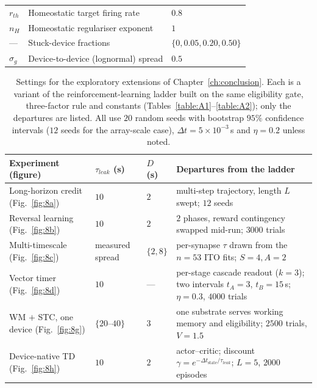\begin{table}[htbp!]
\begin{center}
\begin{tabularx}{\textwidth}{@{}l X l@{}}
    $r_{th}$       & Homeostatic target firing rate                 & $0.8$ \\
    $n_H$          & Homeostatic regulariser exponent               & $1$ \\
    ---            & Stuck-device fractions                         & $\{0,0.05,0.20,0.50\}$ \\
    $\sigma_g$     & Device-to-device (lognormal) spread            & $0.5$ \\
    \bottomrule
    \end{tabularx}
    \label{table:A6}
    \end{center}
    \vspace*{-\baselineskip}
\end{table}

\begin{table}[htbp!]
    \caption[Exploratory-extension settings (Chapter~\ref{ch:conclusion}).]{Settings for
    the exploratory extensions of Chapter~\ref{ch:conclusion}. Each is a variant of the
    reinforcement-learning ladder built on the same eligibility gate, three-factor rule
    and constants (Tables~\ref{table:A1}--\ref{table:A2}); only the departures are
    listed. All use $20$ random seeds with bootstrap $95\%$ confidence intervals
    ($12$ seeds for the array-scale case), $\Delta t = 5\times10^{-3}$\,s and
    $\eta = 0.2$ unless noted.}
    \begin{center}
    \footnotesize
    \begin{tabularx}{\textwidth}{@{}X l l X@{}}
    \toprule
    Experiment (figure) & $\tau_{leak}$ (s) & $D$ (s) & Departures from the ladder \\
    \midrule
    Long-horizon credit (Fig.~\ref{fig:8a}) & $10$ & $2$ & multi-step trajectory, length $L$ swept; $12$ seeds \\
    Reversal learning (Fig.~\ref{fig:8b}) & $10$ & $2$ & $2$ phases, reward contingency swapped mid-run; $3000$ trials \\
    Multi-timescale (Fig.~\ref{fig:8c}) & measured spread & $\{2,8\}$ & per-synapse $\tau$ drawn from the $n=53$ ITO fits; $S{=}4,A{=}2$ \\
    Vector timer (Fig.~\ref{fig:8d}) & $10$ & --- & per-stage cascade readout ($k{=}3$); two intervals $t_A{=}3$, $t_B{=}15$\,s; $\eta=0.3$, $4000$ trials \\
    WM $+$ STC, one device (Fig.~\ref{fig:8g}) & $\{20\text{--}40\}$ & $3$ & one substrate serves working memory and eligibility; $2500$ trials, $V{=}1.5$ \\
    Device-native TD (Fig.~\ref{fig:8h}) & $10$ & $2$ & actor--critic; discount $\gamma=e^{-\Delta t_{\text{state}}/\tau_{leak}}$; $L{=}5$, $2000$ episodes \\
    \bottomrule
    \end{tabularx}
    \label{table:A7}
    \end{center}
    \vspace*{-\baselineskip}
\end{table}

